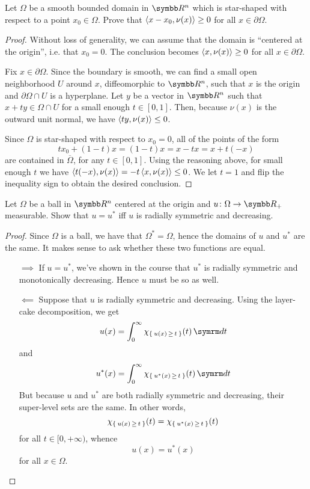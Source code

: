\begin{exercise}
Let \(\Omega\) be a smooth bounded domain in \(\reals^n\) which is star-shaped with respect to a point \(x_0 \in \Omega\). Prove that \(\left\langle x - x_0, \nu(x) \right\rangle \geq 0\) for all \(x \in \partial \Omega\).
\end{exercise}
\begin{proof}
Without loss of generality, we can assume that the domain is ``centered at the origin'', i.e. that \(x_0 = 0\). The conclusion becomes \(\left\langle x, \nu(x) \right\rangle \geq 0\) for all \(x \in \partial \Omega\).

Fix \(x \in \partial \Omega\). Since the boundary is smooth, we can find a small open neighborhood \(U\) around \(x\), diffeomorphic to \(\reals^n\), such that \(x\) is the origin and \(\partial \Omega \cap U\) is a hyperplane. Let \(y\) be a vector in \(\reals^n\) such that \(x + t y \in \Omega \cap U\) for a small enough \(t \in [0, 1]\). Then, because \(\nu(x)\) is the outward unit normal, we have \(\left\langle ty, \nu(x) \right\rangle \leq 0\).

Since \(\Omega\) is star-shaped with respect to \(x_0 = 0\), all of the points of the form
\[
    t x_0 + (1-t) x = (1 - t)x = x - tx = x + t (-x)
\]
are contained in \(\overline{\Omega}\), for any \(t \in [0, 1]\). Using the reasoning above, for small enough \(t\) we have \(\left\langle t (-x), \nu(x) \right\rangle = -t \left\langle x, \nu(x) \right\rangle \leq 0\). We let \(t = 1\) and flip the inequality sign to obtain the desired conclusion.
\end{proof}

\begin{exercise}
Let \(\Omega\) be a ball in \(\reals^n\) centered at the origin and \(u \colon \Omega \to \reals_{+}\) measurable. Show that \(u = u^{*}\) iff \(u\) is radially symmetric and decreasing.
\end{exercise}
\begin{proof}
Since \(\Omega\) is a ball, we have that \(\Omega^* = \Omega\), hence the domains of \(u\) and \(u^*\) are the same. It makes sense to ask whether these two functions are equal.

\begin{itemize}
    \item[\(\implies\)] If \(u = u^{*}\), we've shown in the course that \(u^*\) is radially symmetric and monotonically decreasing. Hence \(u\) must be so as well.

    \item[\(\impliedby\)] Suppose that \(u\) is radially symmetric and decreasing. Using the layer-cake decomposition, we get
    \[
        u(x) = \int_{0}^{\infty} \chi_{\Set{u(x) \, \geq \, t}} (t) \diff t
    \]
    and
    \[
        u^* (x) = \int_{0}^{\infty} \chi_{\Set{u^*(x) \, \geq \, t}} (t) \diff t
    \]
    But because \(u\) and \(u^*\) are both radially symmetric and decreasing, their super-level sets are the same. In other words,
    \[
        \chi_{\Set{u(x) \, \geq \, t}} (t) = \chi_{\Set{u^*(x) \, \geq \, t}} (t)
    \]
    for all \(t \in [0, +\infty)\), whence
    \[
        u (x) = u^* (x)
    \]
    for all \(x \in \Omega\).
\end{itemize}
\end{proof}

